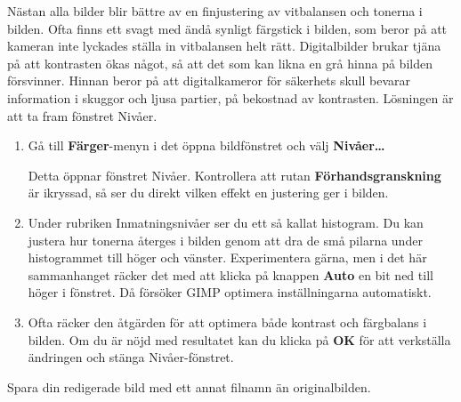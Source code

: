 \documentclass[a4paper,final]{memoir} %
\begin{document}

Nästan alla bilder blir bättre av en finjustering av vitbalansen och tonerna i bilden. Ofta finns ett svagt med ändå synligt färgstick i bilden, som beror på att kameran inte lyckades ställa in vitbalansen helt rätt. Digitalbilder brukar tjäna på att kontrasten ökas något, så att det som kan likna en grå hinna på bilden försvinner. Hinnan beror på att digitalkameror för säkerhets skull bevarar information i skuggor och ljusa partier, på bekostnad av kontrasten. Lösningen är att ta fram fönstret Nivåer.

\label{fig:gimp-xp-nivaer}

\begin{enumerate}

\item Gå till \textbf{Färger}-menyn i det öppna bildfönstret och välj \textbf{Nivåer\ldots{}}


Detta öppnar fönstret Nivåer. Kontrollera att rutan \textbf{Förhandsgranskning} är ikryssad, så ser du direkt vilken effekt en justering ger i bilden.

\item Under rubriken Inmatningsnivåer ser du ett så kallat histogram. Du kan justera hur tonerna återges i bilden genom att dra de små pilarna under histogrammet till höger och vänster. Experimentera gärna, men i det här sammanhanget räcker det med att klicka på knappen \textbf{Auto} en bit ned till höger i fönstret. Då försöker GIMP optimera inställningarna automatiskt.

\item Ofta räcker den åtgärden för att optimera både kontrast och färgbalans i bilden. Om du är nöjd med resultatet kan du klicka på \textbf{OK} för att verkställa ändringen och stänga Nivåer-fönstret.

\end{enumerate}

Spara din redigerade bild med ett annat filnamn än originalbilden.
\end{document}
